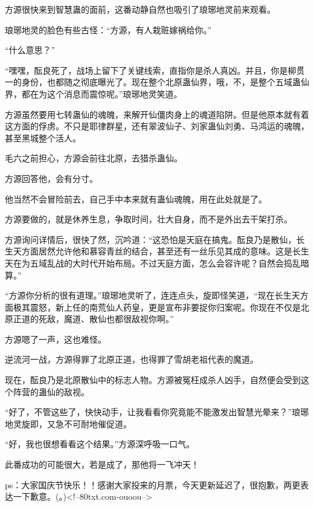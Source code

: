 \begin{this_body}
方源很快来到智慧蛊的面前，这番动静自然也吸引了琅琊地灵前来观看。

琅琊地灵的脸色有些古怪：“方源，有人栽赃嫁祸给你。”

“什么意思？”

“嘿嘿，酝良死了，战场上留下了关键线索，直指你是杀人真凶。并且，你是柳贯一的身份，也都随之彻底曝光了。现在整个北原蛊仙界，哦，不，是整个五域蛊仙界，都在为这个消息而震惊呢。”琅琊地灵笑道。

方源虽然要用七转蛊仙的魂魄，来解开仙僵肉身上的魂道陷阱。但是他原本就有着这方面的俘虏。不只是耶律群星，还有翠波仙子、刘家蛊仙刘勇、马鸿运的魂魄，甚至黑城整个活人。

毛六之前担心，方源会前往北原，去猎杀蛊仙。

方源回答他，会有分寸。

他当然不会冒险前去，自己手中本来就有蛊仙魂魄，用在此处就是了。

方源要做的，就是休养生息，争取时间，壮大自身，而不是外出去干架打杀。

方源询问详情后，很快了然，沉吟道：“这恐怕是天庭在搞鬼。酝良乃是散仙，长生天方面居然允许他和慕容青丝的结合，甚至还有一丝乐见其成的意味。这是长生天在为五域乱战的大时代开始布局。不过天庭方面，怎么会容许呢？自然会捣乱暗算。”

“方源你分析的很有道理。”琅琊地灵听了，连连点头，旋即怪笑道，“现在长生天方面极其震怒，新上任的南荒仙人药皇，更是宣布非要捉你归案呢。你现在不仅是北原正道的死敌，魔道、散仙也都很敌视你啊。”

方源嗯了一声，这也难怪。

逆流河一战，方源得罪了北原正道，也得罪了雪胡老祖代表的魔道。

现在，酝良乃是北原散仙中的标志人物。方源被冤枉成杀人凶手，自然便会受到这个阵营的蛊仙的敌视。

“好了，不管这些了，快快动手，让我看看你究竟能不能激发出智慧光晕来？”琅琊地灵旋即，又急不可耐地催促道。

“好，我也很想看看这个结果。”方源深呼吸一口气。

此番成功的可能很大，若是成了，那他将一飞冲天！

ps：大家国庆节快乐！！感谢大家投来的月票，今天更新延迟了，很抱歉，两更表达一下歉意。(。)<!--80txt.com-ouoou-->

\end{this_body}

